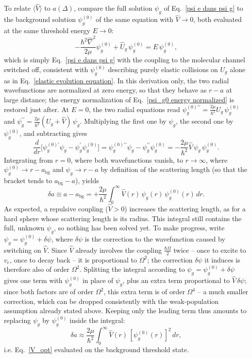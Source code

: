 To relate $\langle\hat V\rangle$ to $a(\Delta)$, compare the full solution
$\psi_g$ of Eq.~\ref{psi e dans psi g} to the background solution
$\psi_g^{(0)}$ of the same equation with $\hat V\to0$, both evaluated at the
same threshold energy $E\to0$:
\begin{equation}
    -\frac{\hbar^2\hat\nabla^2}{2\mu}\psi_g^{(0)} + \hat U_g\,\psi_g^{(0)} = E\,\psi_g^{(0)},
    \label{psi_g0}
\end{equation}
which is simply Eq.~\ref{psi e dans psi g} with the coupling to the
molecular channel switched off, consistent with $\psi_g^{(0)}$ describing
purely elastic collisions on $U_g$ alone as in Eq.~\ref{elastic evolution equation}.
In this derivation only, the two radial wavefunctions are normalized at zero energy,
so that they behave as $r-a$ at large distance; the energy normalization of
Eq.~\ref{psi_g0 energy normalized} is restored just after. At $E=0$, the two radial
equations read $\psi_g^{(0)\prime\prime}=\frac{2\mu}{\hbar^2}U_g\,\psi_g^{(0)}$ and
$\psi_g^{\prime\prime}=\frac{2\mu}{\hbar^2}(U_g+\hat V)\,\psi_g$. Multiplying the first
one by $\psi_g$, the second one by $\psi_g^{(0)}$, and subtracting gives
$$\frac{d}{dr}\Big[\psi_g^{(0)\prime}\psi_g-\psi_g^{\prime}\psi_g^{(0)}\Big]
=\psi_g^{(0)\prime\prime}\psi_g-\psi_g^{\prime\prime}\psi_g^{(0)}
=-\frac{2\mu}{\hbar^2}\hat V\,\psi_g\,\psi_g^{(0)}.$$
Integrating from $r=0$, where both wavefunctions vanish, to $r\to\infty$,
where $\psi_g^{(0)}\to r-a_{\text{bg}}$ and $\psi_g\to r-a$ by definition of
the scattering length (so that the bracket tends to $a_{\text{bg}}-a$), yields
$$\delta a \equiv a-a_{\text{bg}} = +\frac{2\mu}{\hbar^2}
\int_0^\infty \hat V(r)\,\psi_g(r)\,\psi_g^{(0)}(r)\,dr.$$
As expected, a repulsive coupling ($\hat V>0$) increases the scattering length, as
for a hard sphere whose scattering length is its radius.
This integral still contains the full, unknown $\psi_g$, so nothing has been
solved yet. To make progress, write $\psi_g=\psi_g^{(0)}+\delta\psi$, where
$\delta\psi$ is the correction to the wavefunction caused by switching on
$\hat V$. Since $\hat V$ already involves the coupling $\frac{\hbar\Omega}{2}$
twice -- once to excite to $v_e$, once to decay back -- it is proportional
to $\Omega^2$; the correction $\delta\psi$ it induces is therefore also of
order $\Omega^2$. Splitting the integral according to
$\psi_g=\psi_g^{(0)}+\delta\psi$ gives one term with $\psi_g^{(0)}$ in place
of $\psi_g$, plus an extra term proportional to $\hat V\,\delta\psi$; since
both factors are of order $\Omega^2$, this extra term is of order $\Omega^4$
-- a much smaller correction, which can be dropped consistently with the
weak-population assumption already stated above. Keeping only the leading
term thus amounts to replacing $\psi_g$ by $\psi_g^{(0)}$ inside the
integral:
$$\delta a \approx \frac{2\mu}{\hbar^2}
\int_0^\infty \hat V(r)\,\left[\psi_g^{(0)}(r)\right]^2\,dr,$$
i.e. Eq.~\ref{V_opt} evaluated on the background threshold state.

